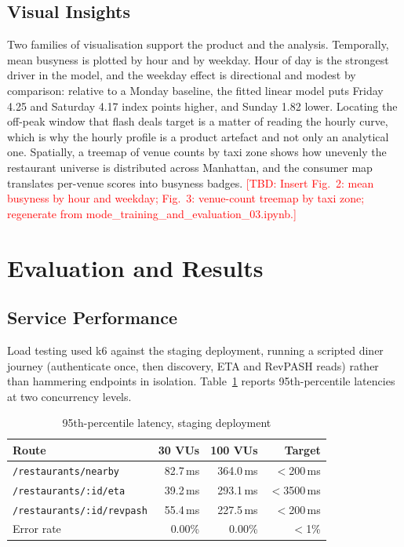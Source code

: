 \documentclass[conference]{IEEEtran}
\newcommand{\tbd}[1]{\textcolor{red}{[TBD: #1]}}
\begin{document}
\subsection{Visual Insights}

Two families of visualisation support the product and the analysis. Temporally, mean busyness is plotted by hour and by weekday. Hour of day is the strongest driver in the model, and the weekday effect is directional and modest by comparison: relative to a Monday baseline, the fitted linear model puts Friday 4.25 and Saturday 4.17 index points higher, and Sunday 1.82 lower. Locating the off-peak window that flash deals target is a matter of reading the hourly curve, which is why the hourly profile is a product artefact and not only an analytical one. Spatially, a treemap of venue counts by taxi zone shows how unevenly the restaurant universe is distributed across Manhattan, and the consumer map translates per-venue scores into busyness badges. \tbd{Insert Fig.~2: mean busyness by hour and weekday; Fig.~3: venue-count treemap by taxi zone; regenerate from mode\_training\_and\_evaluation\_03.ipynb.}

\section{Evaluation and Results}

\subsection{Service Performance}

Load testing used k6 against the staging deployment, running a scripted diner journey (authenticate once, then discovery, ETA and RevPASH reads) rather than hammering endpoints in isolation. Table~\ref{tab:latency} reports 95th-percentile latencies at two concurrency levels.

\begin{table}[htbp]
\caption{95th-percentile latency, staging deployment}
\label{tab:latency}
\centering
\begin{tabular}{lrrr}
\toprule
Route & 30 VUs & 100 VUs & Target \\
\midrule
\texttt{/restaurants/nearby} & 82.7\,ms & 364.0\,ms & $<$200\,ms \\
\texttt{/restaurants/:id/eta} & 39.2\,ms & 293.1\,ms & $<$3500\,ms \\
\texttt{/restaurants/:id/revpash} & 55.4\,ms & 227.5\,ms & $<$200\,ms \\
Error rate & 0.00\% & 0.00\% & $<$1\% \\
\bottomrule
\end{tabular}
\end{table}
\end{document}
